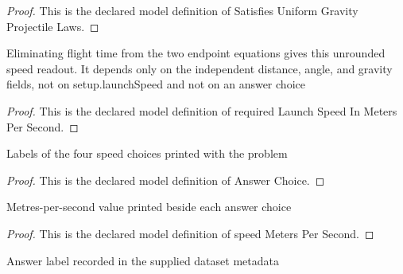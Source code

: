 \begin{proof}
  This is the declared model definition of Satisfies Uniform Gravity Projectile Laws.
\end{proof}
\begin{definition}
  \label{def:physics:phyx-mini-0752:phyxminiproblems-problemphyxmini0752-requiredlaunchspeedinmeterspersecond}
  Eliminating flight time from the two endpoint equations gives this unrounded speed readout. It depends only on the independent distance, angle, and gravity fields, not on setup.launchSpeed and not on an answer choice
\end{definition}
\begin{proof}
  This is the declared model definition of required Launch Speed In Meters Per Second.
\end{proof}
\begin{definition}
  \label{def:physics:phyx-mini-0752:phyxminiproblems-problemphyxmini0752-answerchoice}
  Labels of the four speed choices printed with the problem
\end{definition}
\begin{proof}
  This is the declared model definition of Answer Choice.
\end{proof}
\begin{definition}
  \label{def:physics:phyx-mini-0752:phyxminiproblems-problemphyxmini0752-answerchoice-speedmeterspersecond}
  Metres-per-second value printed beside each answer choice
\end{definition}
\begin{proof}
  This is the declared model definition of speed Meters Per Second.
\end{proof}
\begin{definition}
  \label{def:physics:phyx-mini-0752:phyxminiproblems-problemphyxmini0752-recordedanswerchoice}
  Answer label recorded in the supplied dataset metadata
\end{definition}
